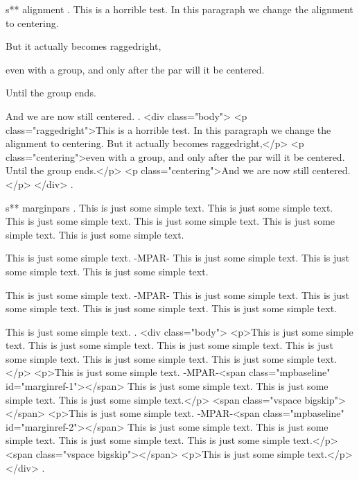 s** alignment
.
This is a horrible test.
\centering
In this paragraph we change the alignment to centering.
{\raggedright But it actually becomes raggedright,

even with a group, and only after the par will it be centered.}
Until the group ends.

And we are now still centered.
.
<div class="body">
<p class="raggedright">This is a horrible test. In this paragraph we change the alignment to centering. But it actually becomes raggedright,</p>
<p class="centering">even with a group, and only after the par will it be centered.​ Until the group ends.</p>
<p class="centering">And we are now still centered.</p>
</div>
.


s** marginpars
.
This is just some simple text. This is just some simple text.
This is just some simple text. This is just some simple text.
This is just some simple text. This is just some simple text.

This is just some simple text. -MPAR- This is just some simple text.
This is just some simple text. This is just some simple text.

\bigbreak

This is just some simple text. -MPAR- This is just some simple text. This is just some simple text.
This is just some simple text. This is just some simple text.

\bigbreak

This is just some simple text.
.
<div class="body">
<p>This is just some simple text. This is just some simple text. This is just some simple text. This is just some simple text. This is just some simple text. This is just some simple text.</p>
<p>This is just some simple text. ‐MPAR‐<span class="mpbaseline" id="marginref-1"></span> This is just some simple text. This is just some simple text. This is just some simple text.</p>
<span class="vspace bigskip"></span>
<p>This is just some simple text. ‐MPAR‐<span class="mpbaseline" id="marginref-2"></span> This is just some simple text. This is just some simple text. This is just some simple text. This is just some simple text.</p>
<span class="vspace bigskip"></span>
<p>This is just some simple text.</p>
</div>
.